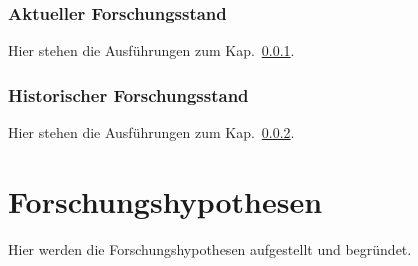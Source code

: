 \subsubsection{Aktueller Forschungsstand}\label{sec:aktueller-forschungsstand}
Hier stehen die Ausführungen zum Kap.~\ref{sec:aktueller-forschungsstand}.

\subsubsection{Historischer Forschungsstand}\label{sec:historischer-forschungsstand}
Hier stehen die Ausführungen zum Kap.~\ref{sec:historischer-forschungsstand}.

\section{Forschungshypothesen}\label{sec:forschungshypothesen}
Hier werden die Forschungshypothesen aufgestellt und begründet.